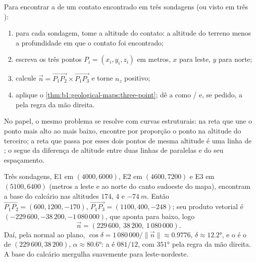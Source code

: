 \begin{method}\label{met:b1:geological-maps:three-point}
Para encontrar a  de um contato encontrado em três sondagens (ou visto em três ):
\begin{enumerate}
  \item para cada sondagem, tome a altitude do contato: a altitude do terreno menos a profundidade em que o contato foi encontrado;
  \item escreva os três pontos $P_i = (x_i, y_i, z_i)$ em metros, $x$ para leste,
        $y$ para norte;
  \item calcule $\vec n = \overrightarrow{P_1P_2} \times
        \overrightarrow{P_1P_3}$ e torne $n_z$ positivo;
  \item aplique o \cref{thm:b1:geological-maps:three-point}; dê a  como / e, se pedido, a  pela regra da mão direita.
\end{enumerate}
No papel, o mesmo problema se resolve com curvas estruturais: na reta que une o ponto mais alto ao mais baixo, encontre por proporção o ponto na altitude do terceiro; a reta que passa por esses dois pontos de mesma altitude é uma linha de ; o  segue da diferença de altitude entre duas linhas de  paralelas e do seu espaçamento.
\end{method}

\begin{example}\label{ex:b1:geological-maps:east}
Três sondagens, E1 em $(4000, 6000)$, E2 em $(4600, 7200)$ e E3 em
$(5100, 6400)$ (metros a leste e ao norte do canto sudoeste do mapa), encontram
a base do calcário nas altitudes $174$, $4$ e $\qty{-74}{m}$. Então
$\overrightarrow{P_1P_2} = (600, 1200, -170)$,
$\overrightarrow{P_1P_3} = (1100, 400, -248)$; seu produto vetorial é
$(-229\,600, -38\,200, -1\,080\,000)$, que aponta para baixo, logo
\[
  \vec n = (229\,600,\ 38\,200,\ 1\,080\,000).
\]
Daí, pela normal ao plano, $\cos\delta = 1\,080\,000/\|\vec n\| \approx
0.9776$, $\delta \approx \ang{12.2}$, e o  é o  de
$(229\,600, 38\,200)$, $\alpha \approx \ang{80.6}$: a  é
$081/12$, com  $\ang{351}$ pela regra da mão direita. A base do
calcário mergulha suavemente para leste-nordeste.
\end{example}

